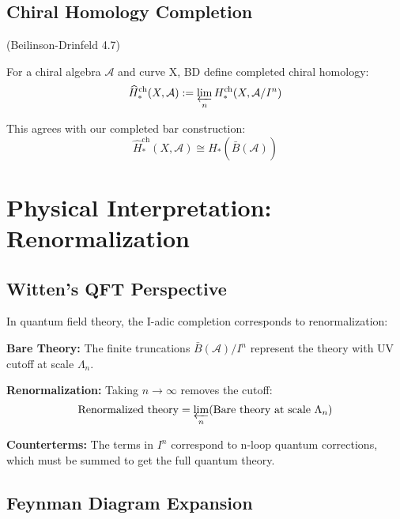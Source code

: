 \subsection{Chiral Homology Completion}

\begin{theorem}\label{thm:BD-chiral-homology}
\textup{(Beilinson-Drinfeld 4.7)}

For a chiral algebra $\mathcal{A}$ and curve X, BD define completed chiral homology:
$$\widehat{H}_*^{\text{ch}}(X, \mathcal{A}) := \varprojlim_n H_*^{\text{ch}}(X, \mathcal{A}/I^n)$$

This agrees with our completed bar construction:
$$\widehat{H}_*^{\text{ch}}(X, \mathcal{A}) \cong H_*(\widehat{\bar{B}}(\mathcal{A}))$$
\end{theorem}

\section{Physical Interpretation: Renormalization}

\subsection{Witten's QFT Perspective}

\begin{interpretation}\label{interp:completion-renorm}
In quantum field theory, the I-adic completion corresponds to renormalization:

\textbf{Bare Theory:}
The finite truncations $\bar{B}(\mathcal{A})/I^n$ represent the theory with UV cutoff at scale $\Lambda_n$.

\textbf{Renormalization:}
Taking $n \to \infty$ removes the cutoff:
$$\text{Renormalized theory} = \varprojlim_n (\text{Bare theory at scale } \Lambda_n)$$

\textbf{Counterterms:}
The terms in $I^n$ correspond to n-loop quantum corrections, which must be summed to get the full quantum theory.
\end{interpretation}

\subsection{Feynman Diagram Expansion}


